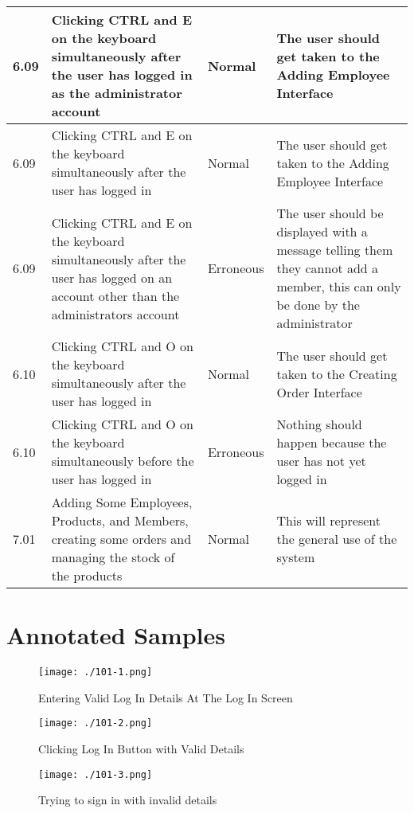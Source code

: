 \begin{flushleft}
\begin{longtable}{|p{1.5cm}|p{2.5cm}|p{2cm}|p{4.5cm}|}
	\rowcolor{light-grey} 6.09 & Clicking CTRL and E on the keyboard simultaneously after the user has logged in as the administrator account & Normal & The user should get taken to the Adding Employee Interface \\ \hline
	\rowcolor{light-grey} 6.09 & Clicking CTRL and E on the keyboard simultaneously after the user has logged in & Normal & The user should get taken to the Adding Employee Interface \\ \hline
	\rowcolor{light-grey} 6.09 & Clicking CTRL and E on the keyboard simultaneously after the user has logged on an account other than the administrators account & Erroneous & The user should be displayed with a message telling them they cannot add a member, this can only be done by the administrator \\ \hline
	\rowcolor{light-grey} 6.10 & Clicking CTRL and O on the keyboard simultaneously after the user has logged in & Normal & The user should get taken to the Creating Order Interface \\ \hline
	\rowcolor{light-grey} 6.10 & Clicking CTRL and O on the keyboard simultaneously before the user has logged in & Erroneous & Nothing should happen because the user has not yet logged in \\ \hline
	\rowcolor{light-grey} 7.01 & Adding Some Employees, Products, and Members, creating some orders and managing the stock of the products & Normal & This will represent the general use of the system \\ \hline
    \end{longtable}
\end{flushleft}


\section{Annotated Samples}

\begin{figure}[H]
    \texttt{[image: ./101-1.png]}
    \caption{Entering Valid Log In Details At The Log In Screen} \label{fig:101-1}
\end{figure}

\begin{figure}[H]
    \texttt{[image: ./101-2.png]}
    \caption{Clicking Log In Button with Valid Details} \label{fig:101-2}
\end{figure}

\begin{figure}[H]
    \texttt{[image: ./101-3.png]}
    \caption{Trying to sign in with invalid details} \label{fig:101-3}
\end{figure}

